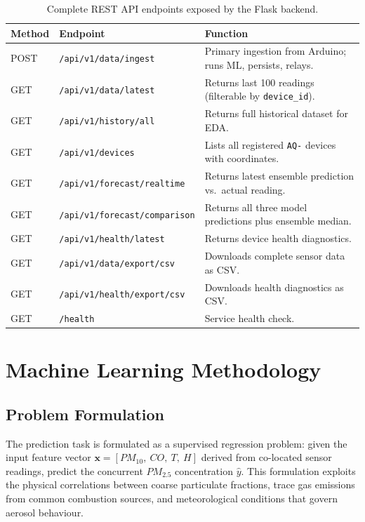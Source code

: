 \documentclass[12pt,a4paper]{article}
\begin{document}
\begin{table}[H]
\centering
\caption{Complete REST API endpoints exposed by the Flask backend.}
\label{tab:endpoints}
\begin{tabular}{@{}llp{6.5cm}@{}}
\toprule
\textbf{Method} & \textbf{Endpoint} & \textbf{Function} \\
\midrule
POST & \texttt{/api/v1/data/ingest} & Primary ingestion from Arduino; runs ML, persists, relays. \\
GET & \texttt{/api/v1/data/latest} & Returns last 100 readings (filterable by \texttt{device\_id}). \\
GET & \texttt{/api/v1/history/all} & Returns full historical dataset for EDA. \\
GET & \texttt{/api/v1/devices} & Lists all registered \texttt{AQ-} devices with coordinates. \\
GET & \texttt{/api/v1/forecast/realtime} & Returns latest ensemble prediction vs.\ actual reading. \\
GET & \texttt{/api/v1/forecast/comparison} & Returns all three model predictions plus ensemble median. \\
GET & \texttt{/api/v1/health/latest} & Returns device health diagnostics. \\
GET & \texttt{/api/v1/data/export/csv} & Downloads complete sensor data as CSV. \\
GET & \texttt{/api/v1/health/export/csv} & Downloads health diagnostics as CSV. \\
GET & \texttt{/health} & Service health check. \\
\bottomrule
\end{tabular}
\end{table}

\section{Machine Learning Methodology}
\label{sec:ml}

\subsection{Problem Formulation}
The prediction task is formulated as a supervised regression problem: given the input feature vector $\mathbf{x} = [PM_{10},\ CO,\ T,\ H]$ derived from co-located sensor readings, predict the concurrent $PM_{2.5}$ concentration $\hat{y}$. This formulation exploits the physical correlations between coarse particulate fractions, trace gas emissions from common combustion sources, and meteorological conditions that govern aerosol behaviour.
\end{document}

